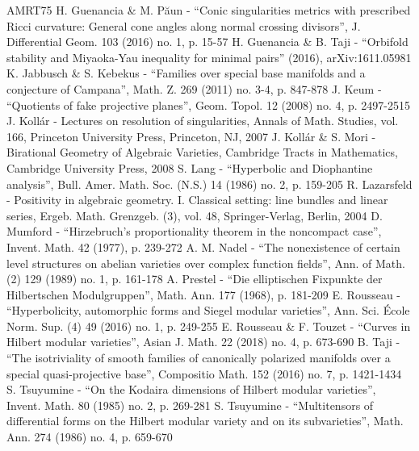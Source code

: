 \documentclass[10pt]{article}
\theoremstyle{definition}
\theoremstyle{remark}
\numberwithin{equation}{theorem}
\begin{document}
\begin{thebibliography}{AMRT75}
 H. Guenancia \& M. Păun - “Conic singularities metrics with prescribed Ricci curvature: General cone angles along normal crossing divisors”, J. Differential Geom. 103 (2016) no. 1, p. 15-57
 H. Guenancia \& B. Taji - “Orbifold stability and Miyaoka-Yau inequality for minimal pairs” (2016), arXiv:1611.05981
 K. Jabbusch \& S. Kebekus - “Families over special base manifolds and a conjecture of Campana”, Math. Z. 269 (2011) no. 3-4, p. 847-878
 J. Keum - “Quotients of fake projective planes”, Geom. Topol. 12 (2008) no. 4, p. 2497-2515
 J. Kollár - Lectures on resolution of singularities, Annals of Math. Studies, vol. 166, Princeton University Press, Princeton, NJ, 2007
 J. Kollár \& S. Mori - Birational Geometry of Algebraic Varieties, Cambridge Tracts in Mathematics, Cambridge University Press, 2008
 S. Lang - “Hyperbolic and Diophantine analysis”, Bull. Amer. Math. Soc. (N.S.) 14 (1986) no. 2, p. 159-205
 R. Lazarsfeld - Positivity in algebraic geometry. I. Classical setting: line bundles and linear series, Ergeb. Math. Grenzgeb. (3), vol. 48, Springer-Verlag, Berlin, 2004
 D. Mumford - “Hirzebruch’s proportionality theorem in the noncompact case”, Invent. Math. 42 (1977), p. 239-272
 A. M. Nadel - “The nonexistence of certain level structures on abelian varieties over complex function fields”, Ann. of Math. (2) 129 (1989) no. 1, p. 161-178
 A. Prestel - “Die elliptischen Fixpunkte der Hilbertschen Modulgruppen”, Math. Ann. 177 (1968), p. 181-209
 E. Rousseau - “Hyperbolicity, automorphic forms and Siegel modular varieties”, Ann. Sci. École Norm. Sup. (4) 49 (2016) no. 1, p. 249-255
 E. Rousseau \& F. Touzet - “Curves in Hilbert modular varieties”, Asian J. Math. 22 (2018) no. 4, p. 673-690
 B. Taji - “The isotriviality of smooth families of canonically polarized manifolds over a special quasi-projective base”, Compositio Math. 152 (2016) no. 7, p. 1421-1434
 S. Tsuyumine - “On the Kodaira dimensions of Hilbert modular varieties”, Invent. Math. 80 (1985) no. 2, p. 269-281
 S. Tsuyumine - “Multitensors of differential forms on the Hilbert modular variety and on its subvarieties”, Math. Ann. 274 (1986) no. 4, p. 659-670
\end{thebibliography}
\end{document}
